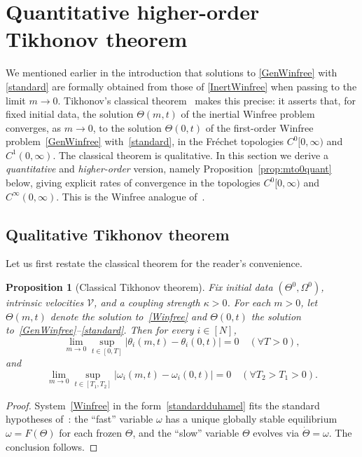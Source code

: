 \documentclass[11pt,reqno]{amsart}
\newcounter{name}
\newtheorem{proposition}[lemma]{Proposition}
\theoremstyle{definition}
\theoremstyle{remark}
\begin{document}
\section{Quantitative higher-order Tikhonov theorem}\label{sec:tikhonov}

We mentioned earlier in the introduction that solutions to \eqref{GenWinfree} with \eqref{standard} are formally obtained from those of \eqref{InertWinfree} when passing to the limit $m\to 0$. 
Tikhonov's classical theorem~\cite{tikhonov1952systems,vasil1963asymptotic} makes this precise: it asserts that, for fixed initial data, the solution $\Theta(m,t)$ of the
inertial Winfree problem converges, as $m\to 0$, to the solution
$\Theta(0,t)$ of the first-order Winfree problem~\eqref{GenWinfree}
with~\eqref{standard}, in the Fr\'echet topologies $C^0[0,\infty)$ and $C^1(0,\infty)$. The classical theorem is qualitative. In this section we
derive a \emph{quantitative} and \emph{higher-order} version, namely
Proposition~\ref{prop:mto0quant} below, giving explicit rates of
convergence in the topologies $C^0[0,\infty)$ and $C^\infty(0,\infty)$.
This is the Winfree analogue of~\cite[Proposition~3.2]{cho2025inertia}.

\subsection{Qualitative Tikhonov theorem}
Let us first restate the classical theorem for the reader's convenience.
\begin{proposition}[Classical Tikhonov theorem]\label{prop:mto0}
Fix initial data $(\Theta^0,\Omega^0)$, intrinsic velocities $\mathcal V$,
and a coupling strength $\kappa>0$. For each $m>0$, let $\Theta(m,t)$
denote the solution to~\eqref{Winfree} and $\Theta(0,t)$ the solution
to~\eqref{GenWinfree}--\eqref{standard}. Then for every $i\in[N]$,
\[
\lim_{m\to 0}\sup_{t\in[0,T]}|\theta_i(m,t)-\theta_i(0,t)|=0\quad(\forall T>0),
\]
and
\[
\lim_{m\to 0}\sup_{t\in[T_1,T_2]}|\omega_i(m,t)-\omega_i(0,t)|=0\quad(\forall T_2>T_1>0).
\]
\end{proposition}
\begin{proof}
System~\eqref{Winfree} in the form~\eqref{standardduhamel} fits the
standard hypotheses of~\cite[Theorem~1.1]{vasil1963asymptotic}: the
``fast'' variable $\omega$ has a unique globally stable equilibrium
$\omega=F(\Theta)$ for each frozen $\Theta$, and the ``slow'' variable
$\Theta$ evolves via $\dot\Theta=\omega$. The conclusion follows.
\end{proof}
\end{document}
